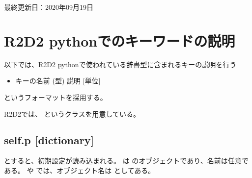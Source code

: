 \documentclass[letterpaper,10pt,dvipdfmx,report]{sphinxmanual}
\begin{document}
最終更新日：2020年09月19日


\chapter{R2D2 pythonでのキーワードの説明}
\label{\detokenize{notation:r2d2-python}}\label{\detokenize{notation::doc}}
以下では、R2D2 pythonで使われている辞書型に含まれるキーの説明を行う
\begin{itemize}
\item {} 
キーの名前 (型) \sphinxhyphen{}\sphinxhyphen{} 説明 {[}単位{]}

\end{itemize}

というフォーマットを採用する。

R2D2では、 というクラスを用意している。


\section{self.p {[}dictionary{]}}
\label{\detokenize{notation:self-p-dictionary}}
\begin{sphinxVerbatim}[commandchars=\\\{\}]
 
  
\end{sphinxVerbatim}

とすると、初期設定が読み込まれる。  は  のオブジェクトであり、名前は任意である。  や  では、オブジェクト名は  としてある。
\end{document}
